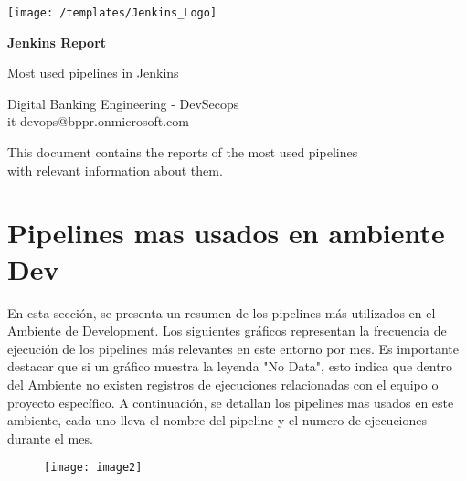 \documentclass{article}
\makeatletter
\def \title{Jenkins Report}
\def \subtitle {Most used pipelines in Jenkins}
\def \authors{
    Digital Banking Engineering - DevSecops\\
    it-devops@bppr.onmicrosoft.com\\

}
\def \Description{
    This document contains the reports of the most used pipelines \\
    with relevant information about them.\\
}
\def \date{today's date}
\makeatother
\begin{document}
\begin{titlepage}
    \begin{center}
        \vspace*{0.7cm}
        
        \texttt{[image: /templates/Jenkins\_Logo]}\\
        
        \vspace{1cm}
        
        \Huge
        \textbf{\title}
            
        \vspace{0.5cm}
        \LARGE
        \subtitle
            
        \vspace{1cm}
        
        \large    
        \authors

        \vspace{2cm}
        
        \Description

        \vspace{2cm}

        
    \end{center}
\end{titlepage}

\section{Pipelines mas usados en ambiente Dev}

\vspace{0.5cm}

En esta sección, se presenta un resumen de los pipelines más utilizados en el Ambiente de Development. Los siguientes gráficos representan la frecuencia de ejecución de los pipelines más relevantes en este entorno por mes.
Es importante destacar que si un gráfico muestra la leyenda "No Data", esto indica que dentro del Ambiente no existen registros de ejecuciones relacionadas con el equipo o proyecto específico.
A continuación, se detallan los pipelines mas usados en este ambiente, cada uno lleva el nombre del pipeline y el numero de ejecuciones durante el mes.

\vspace{0.8cm}

\begin{figure}[H]
    \centering
        \texttt{[image: image2]}\\
\end{figure}
\end{document}
